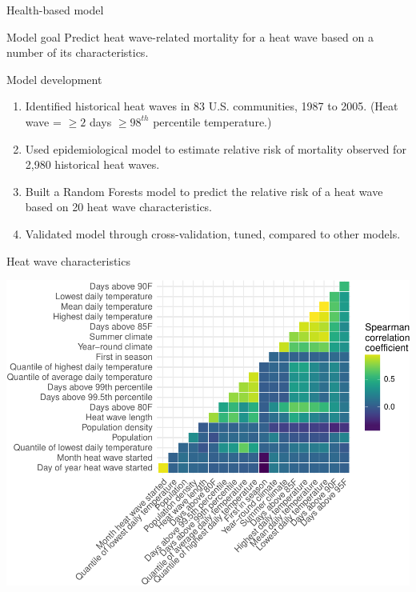 \documentclass[ignorenonframetext,]{beamer}
\begin{document}
\begin{frame}{Health-based model}

\begin{block}{Model goal}
Predict heat wave-related mortality for a heat wave based on a number of its characteristics.
\end{block}

\small

\begin{block}{Model development}
\begin{enumerate}
\item Identified historical heat waves in 83 U.S. communities, 1987 to 2005. (Heat wave = $\ge2$ days $\ge98^{th}$ percentile temperature.)
\item Used epidemiological model to estimate relative risk of mortality observed for 2,980 historical heat waves.
\item Built a Random Forests model to predict the relative risk of a heat wave based on 20 heat wave characteristics.
\item Validated model through cross-validation, tuned, compared to other models.
\end{enumerate}
\end{block}

\end{frame}

\begin{frame}{Heat wave characteristics}

\begin{center}\includegraphics[height=0.85\textheight]{anderson_sees_2017_files/figure-beamer/unnamed-chunk-12-1} \end{center}

\end{frame}
\end{document}
